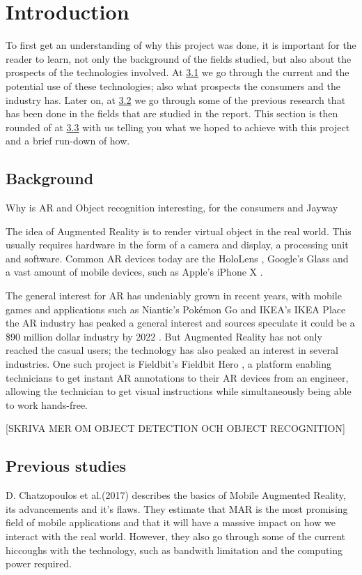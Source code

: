 \section{Introduction}
To first get an understanding of why this project was done, it is important for the reader to learn, not only the background of the fields studied, but also about the prospects of the technologies involved.
 At \hyperref[subsecBackground]{3.1} we go through the current and the potential use of these technologies; also what prospects the consumers and the industry has. Later on, at  \hyperref[subsecPrevStud]{3.2} we go through some of the previous research that has been done in the fields that are studied in the report. This section is then rounded of at \hyperref[subsecGoal]{3.3} with us telling you what we hoped to achieve with this project and a brief run-down of how.

\subsection{Background}
\label{subsecBackground}
Why is AR and Object recognition interesting, for the consumers and Jayway

The idea of Augmented Reality is to render virtual object in the real world. This usually requires hardware in the form of a camera and display, a processing unit and software. Common AR devices today are the HoloLens \cite{microsoft}, Google's Glass \cite{googleGlasses} and a vast amount of mobile devices, such as Apple's iPhone X \cite{appleAR}. 

The general interest for AR has undeniably grown in recent years, with mobile games and applications such as Niantic's Pokémon Go \cite{pokemonGO} and IKEA's IKEA Place \cite{IKEAPlace} the AR industry has peaked a general interest and sources speculate it could be a \$90 million dollar industry by 2022 \cite{digi-capital}.
 But Augmented Reality has not only reached the casual users; the technology has also peaked an interest in several industries. One such project is Fieldbit's Fieldbit Hero \cite{fieldbit}, a platform enabling technicians to get instant AR annotations to their AR devices from an engineer, allowing the technician to get visual instructions while simultaneously  being able to work hands-free. 
 
[SKRIVA MER OM OBJECT DETECTION OCH OBJECT RECOGNITION]

\subsection{Previous studies}
\label{subsecPrevStud}
D. Chatzopoulos et al.(2017) describes the basics of Mobile Augmented Reality, its advancements and it's flaws. They estimate that MAR is the most promising field of mobile applications and that it will have a massive impact on how we interact with the real world. However, they also go through some of the current hiccoughs with the technology, such as bandwith limitation and the computing power required. 
\cite{MARS}

